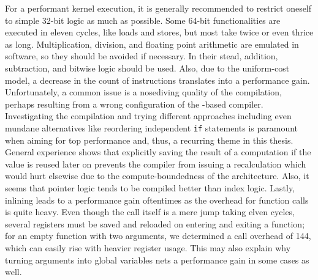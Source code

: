 For a performant kernel execution, it is generally recommended to restrict oneself to simple 32-bit logic as much as possible.
Some 64-bit functionalities are executed in eleven cycles, like loads and stores, but most take twice or even thrice as long.
Multiplication, division, and floating point arithmetic are emulated in software, so they should be avoided if necessary.
In their stead, addition, subtraction, and bitwise logic should be used.
Also, due to the uniform-cost model, a decrease in the count of instructions translates into a performance gain.
Unfortunately, a common issue is a nosediving quality of the compilation, perhaps resulting from a wrong configuration of the -based compiler.
Investigating the compilation and trying different approaches \Dash including even mundane alternatives like reordering independent \lstinline|if| statements \Dash is paramount when aiming for top performance and, thus, a recurring theme in this thesis.
General experience shows that explicitly saving the result of a computation if the value is reused later on prevents the compiler from issuing a recalculation which would hurt elsewise due to the compute-boundedness of the architecture.
Also, it seems that pointer logic tends to be compiled better than index logic.
Lastly, inlining leads to a performance gain oftentimes as the overhead for function calls is quite heavy.
Even though the call itself is a mere jump taking elven cycles, several registers must be saved and reloaded on entering and exiting a function;
for an empty function with two arguments, we determined a call overhead of \qty{144}{\cycles}, which can easily rise with heavier register usage.
This may also explain why turning arguments into global variables nets a performance gain in some cases as well.
